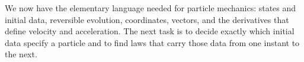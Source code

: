 We now have the elementary language needed for particle mechanics: states and
initial data, reversible evolution, coordinates, vectors, and the derivatives
that define velocity and acceleration.  The next task is to decide exactly
which initial data specify a particle and to find laws that carry those data
from one instant to the next.
